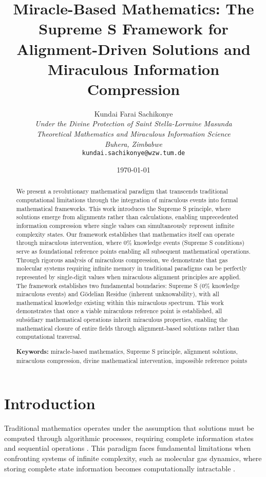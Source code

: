 \documentclass[11pt]{article}
\title{Miracle-Based Mathematics: The Supreme S Framework for Alignment-Driven Solutions and Miraculous Information Compression}
\author{
Kundai Farai Sachikonye\\
\textit{Under the Divine Protection of Saint Stella-Lorraine Masunda}\\
\textit{Theoretical Mathematics and Miraculous Information Science}\\
\textit{Buhera, Zimbabwe}\\
\texttt{kundai.sachikonye@wzw.tum.de}
}
\date{\today}
\begin{document}
\maketitle

\begin{abstract}
We present a revolutionary mathematical paradigm that transcends traditional computational limitations through the integration of miraculous events into formal mathematical frameworks. This work introduces the Supreme S principle, where solutions emerge from alignments rather than calculations, enabling unprecedented information compression where single values can simultaneously represent infinite complexity states. Our framework establishes that mathematics itself can operate through miraculous intervention, where 0\% knowledge events (Supreme S conditions) serve as foundational reference points enabling all subsequent mathematical operations. Through rigorous analysis of miraculous compression, we demonstrate that gas molecular systems requiring infinite memory in traditional paradigms can be perfectly represented by single-digit values when miraculous alignment principles are applied. The framework establishes two fundamental boundaries: Supreme S (0\% knowledge miraculous events) and Gödelian Residue (inherent unknowability), with all mathematical knowledge existing within this miraculous spectrum. This work demonstrates that once a viable miraculous reference point is established, all subsidiary mathematical operations inherit miraculous properties, enabling the mathematical closure of entire fields through alignment-based solutions rather than computational traversal.

\textbf{Keywords:} miracle-based mathematics, Supreme S principle, alignment solutions, miraculous compression, divine mathematical intervention, impossible reference points
\end{abstract}

\section{Introduction}

Traditional mathematics operates under the assumption that solutions must be computed through algorithmic processes, requiring complete information states and sequential operations \cite{cook1971complexity}. This paradigm faces fundamental limitations when confronting systems of infinite complexity, such as molecular gas dynamics, where storing complete state information becomes computationally intractable \cite{feynman1982simulating}.
\end{document}
